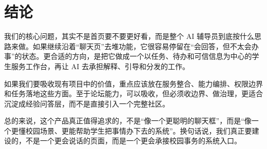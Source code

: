 \documentclass[12pt,a4paper]{ctexart}
\begin{document}
\section{结论}
我们的核心问题，其实不是首页要不要更好看，而是整个 AI 辅导员到底按什么思路来做。如果继续沿着“聊天页”去堆功能，它很容易停留在“会回答，但不太会办事”的状态。更合适的方向，是把它做成一个以任务、待办和可信信息为中心的学生服务工作台，再让 AI 去承担解释、引导和分发的工作。

如果我们要吸收现有项目中的价值，重点应该放在服务整合、能力编排、权限边界和任务落地这些方面。至于论坛能力，可以吸收，但必须收边界、做治理，更适合沉淀成经验问答层，而不是直接引入一个完整社区。

总的来说，这个产品真正值得追求的，不是“像一个更聪明的聊天框”，而是“像一个更懂校园场景、更能帮助学生把事情办下去的系统”。换句话说，我们真正要建设的，不是一个更会说话的页面，而是一个更会承接校园事务的系统入口。
\end{document}
